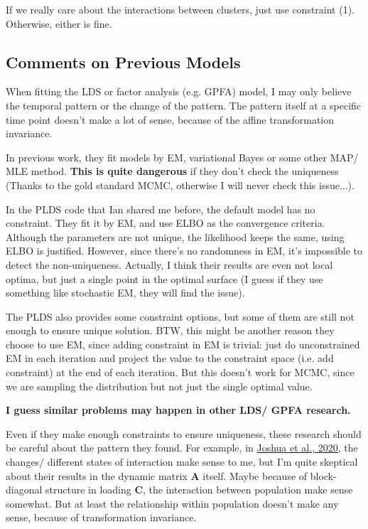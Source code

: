 \documentclass[]{article}
\begin{document}
If we really care about the interactions between clusters, just use constraint (1). Otherwise, either is fine.

\subsection{Comments on Previous Models}
When fitting the LDS or factor analysis (e.g. GPFA) model, I may only believe the temporal pattern or the change of the pattern. The pattern itself at a specific time point doesn't make a lot of sense, because of the affine transformation invariance.

In previous work, they fit models by EM, variational Bayes or some other MAP/ MLE method. \textbf{This is quite dangerous} if they don't check the uniqueness (Thanks to the gold standard MCMC, otherwise I will never check this issue...). 

In the PLDS code that Ian shared me before, the default model has no constraint. They fit it by EM, and use ELBO as the convergence criteria. Although the parameters are not unique, the likelihood keeps the same, using ELBO is justified. However, since there's no randomness in EM, it's impossible to detect the non-uniqueness. Actually, I think their results are even not local optima, but just a single point in the optimal surface (I guess if they use something like stochastic EM, they will find the issue).  

The PLDS also provides some constraint options, but some of them are still not enough to ensure unique solution. BTW, this might be another reason they choose to use EM, since adding constraint in EM is trivial: just do unconstrained EM in each iteration and project the value to the constraint space (i.e. add constraint) at the end of each iteration. But this doesn't work for MCMC, since we are sampling the distribution but not just the single optimal value.

\textbf{I guess similar problems may happen in other LDS/ GPFA research.}

Even if they make enough constraints to ensure uniqueness, these research should be careful about the pattern they found. For example, in \href{https://papers.nips.cc/paper/2020/hash/aa1f5f73327ba40d47ebce155e785aaf-Abstract.html}{Joshua et al., 2020}, the changes/ different states of interaction make sense to me, but I'm quite skeptical about their results in the dynamic matrix $\mathbf{A}$ itself. Maybe because of block-diagonal structure in loading $\mathbf{C}$, the interaction between population make sense somewhat. But at least the relationship within population doesn't make any sense, because of transformation invariance.
\end{document}
